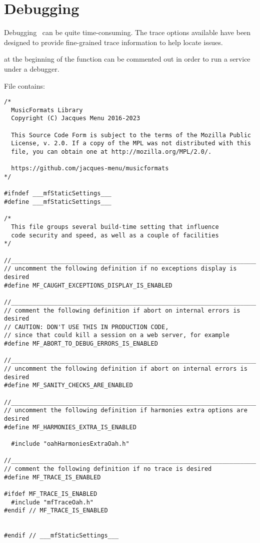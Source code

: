 

\chapter{Debugging}

Debugging \mf\ can be quite time-consuming. The trace options available have been designed to provide fine-grained trace information to help locate issues.

 at the beginning of the  function can be commented out in order to run a service under a debugger.

File  contains:
\begin{lstlisting}[language=CPlusPlus]
/*
  MusicFormats Library
  Copyright (C) Jacques Menu 2016-2023

  This Source Code Form is subject to the terms of the Mozilla Public
  License, v. 2.0. If a copy of the MPL was not distributed with this
  file, you can obtain one at http://mozilla.org/MPL/2.0/.

  https://github.com/jacques-menu/musicformats
*/

#ifndef ___mfStaticSettings___
#define ___mfStaticSettings___

/*
  This file groups several build-time setting that influence
  code security and speed, as well as a couple of facilities
*/

//______________________________________________________________________________
// uncomment the following definition if no exceptions display is desired
#define MF_CAUGHT_EXCEPTIONS_DISPLAY_IS_ENABLED

//______________________________________________________________________________
// comment the following definition if abort on internal errors is desired
// CAUTION: DON'T USE THIS IN PRODUCTION CODE,
// since that could kill a session on a web server, for example
#define MF_ABORT_TO_DEBUG_ERRORS_IS_ENABLED

//______________________________________________________________________________
// uncomment the following definition if abort on internal errors is desired
#define MF_SANITY_CHECKS_ARE_ENABLED

//______________________________________________________________________________
// uncomment the following definition if harmonies extra options are desired
#define MF_HARMONIES_EXTRA_IS_ENABLED

  #include "oahHarmoniesExtraOah.h"

//______________________________________________________________________________
// comment the following definition if no trace is desired
#define MF_TRACE_IS_ENABLED

#ifdef MF_TRACE_IS_ENABLED
  #include "mfTraceOah.h"
#endif // MF_TRACE_IS_ENABLED


#endif // ___mfStaticSettings___
\end{lstlisting}


